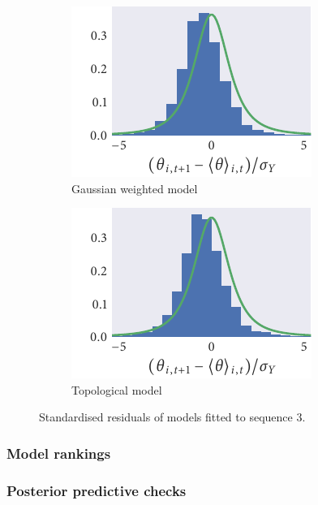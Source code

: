 \begin{figure}
\begin{subfigure}[b]{0.33333\textwidth}
  \end{subfigure}%
  \begin{subfigure}[b]{0.33333\textwidth}
    \includegraphics{seq3/gauss_residuals.pdf}
    \caption{Gaussian weighted model}
  \end{subfigure}%
  \begin{subfigure}[b]{0.33333\textwidth}
    \includegraphics{seq3/top_residuals.pdf}
    \caption{Topological model}
  \end{subfigure}
  \caption{Standardised residuals of models fitted to sequence $3$.}
\end{figure}

\subsubsection{Model rankings}

\subsubsection{Posterior predictive checks}



